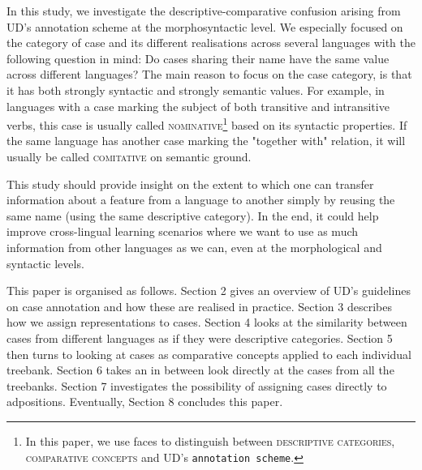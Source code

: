 \documentclass[11pt]{article}
\newcommand{\scsf}[1]{\textsc{\textsf{#1}}} %
\begin{document}
In this study, we investigate the descriptive-comparative confusion arising from UD's annotation scheme at the morphosyntactic level.
We especially focused on the category of case and its different realisations across several languages with the following question in mind:
Do cases sharing their name have the same value across different languages?
The main reason to focus on the case category, is that it has both strongly syntactic and strongly semantic values.
For example, in languages with a case marking the subject of both transitive and intransitive verbs, this case is usually called \scsf{nominative}\footnote{In this paper, we use faces to distinguish between \scsf{descriptive categories}, \textsc{comparative concepts} and UD's \texttt{annotation scheme}.} based on its syntactic properties.
If the same language has another case marking the "together with" relation, it will usually be called \scsf{comitative} on semantic ground.

This study should provide insight on the extent to which one can transfer information about a feature from a language to another simply by reusing the same name (using the same descriptive category).
In the end, it could help improve cross-lingual learning scenarios where we want to use as much information from other languages as we can, even at the morphological and syntactic levels.



This paper is organised as follows.
Section 2 gives an overview of UD's guidelines on case annotation and how these are realised in practice.
Section 3 describes how we assign representations to cases.
Section 4 looks at the similarity between cases from different languages as if they were descriptive categories.
Section 5 then turns to looking at cases as comparative concepts applied to each individual treebank.
Section 6 takes an in between look directly at the cases from all the treebanks.
Section 7 investigates the possibility of assigning cases directly to adpositions.
Eventually, Section 8 concludes this paper.
\end{document}
